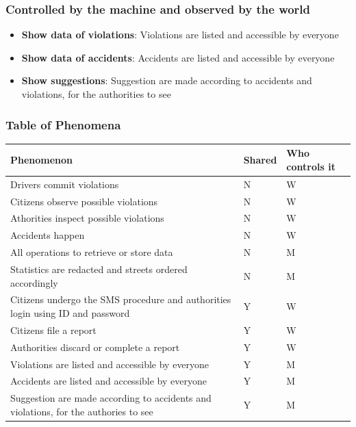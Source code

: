 \subsubsection*{Controlled by the machine and observed by the world}

\begin{itemize}

\item \textbf{Show data of violations}: Violations are listed and accessible by everyone

\item \textbf{Show data of accidents}: Accidents are listed and accessible by everyone

\item \textbf{Show suggestions}: Suggestion are made according to accidents and violations, for the authorities to see

\end{itemize}

\subsubsection{Table of Phenomena}
\begin{tabular}{|l|l|l|}
\hline
\textbf{Phenomenon} & \textbf{Shared} & \textbf{Who controls it} \\ \hline
Drivers commit violations & N & W\\ \hline
Citizens observe possible violations & N & W\\ \hline
Athorities inspect possible violations & N & W\\ \hline
Accidents happen & N & W\\ \hline
All operations to retrieve or store data & N & M\\ \hline
Statistics are redacted and streets ordered accordingly & N & M\\ \hline
Citizens undergo the SMS procedure and authorities login using ID and password & Y & W\\ \hline
Citizens file a report & Y & W\\ \hline
Authorities discard or complete a report & Y & W\\ \hline
Violations are listed and accessible by everyone& Y & M\\ \hline
Accidents are listed and accessible by everyone& Y & M\\ \hline
Suggestion are made according to accidents and violations, for the authories to see & Y & M\\
\hline 
\end{tabular}

